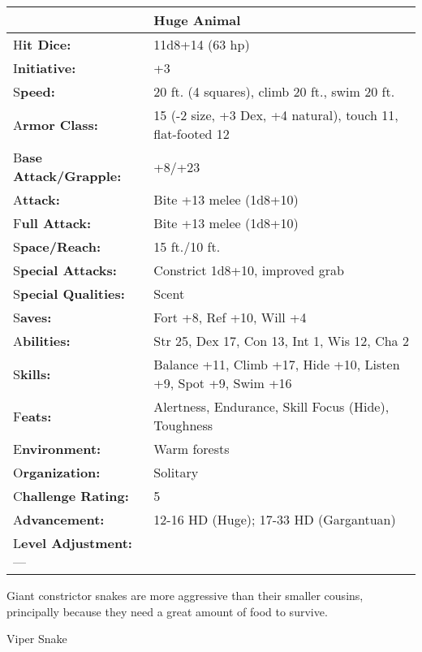 \documentclass{article}
\begin{document}
\begin{tabular}{|>{\raggedright}p{84pt}|>{\raggedright}p{242pt}|}
\hline
  & Huge Animal\tabularnewline
\hline
H\textbf{it Dice:} & 11d8+14 (63 hp)\tabularnewline
\hline
I\textbf{nitiative:} & +3\tabularnewline
\hline
S\textbf{peed:} & 20 ft. (4 squares), climb 20 ft., swim 20 ft.\tabularnewline
\hline
A\textbf{rmor Class:} & 15 (-2 size, +3 Dex, +4 natural), touch 11, flat-footed 
12\tabularnewline
\hline
B\textbf{ase Attack/Grapple:} & +8/+23\tabularnewline
\hline
A\textbf{ttack:} & Bite +13 melee (1d8+10)\tabularnewline
\hline
F\textbf{ull Attack:} & Bite +13 melee (1d8+10)\tabularnewline
\hline
S\textbf{pace/Reach:} & 15 ft./10 ft.\tabularnewline
\hline
S\textbf{pecial Attacks:} & Constrict 1d8+10, improved grab\tabularnewline
\hline
S\textbf{pecial Qualities:} & Scent\tabularnewline
\hline
S\textbf{aves:} & Fort +8, Ref +10, Will +4\tabularnewline
\hline
A\textbf{bilities:} & Str 25, Dex 17, Con 13, Int 1, Wis 12, Cha 2\tabularnewline
\hline
S\textbf{kills:} & Balance +11, Climb +17, Hide +10, Listen +9, Spot +9, Swim +16\tabularnewline
\hline
F\textbf{eats:} & Alertness, Endurance, Skill Focus (Hide), Toughness\tabularnewline
\hline
E\textbf{nvironment:} & Warm forests\tabularnewline
\hline
O\textbf{rganization:} & Solitary\tabularnewline
\hline
C\textbf{hallenge Rating:} & 5\tabularnewline
\hline
A\textbf{dvancement:} & 12-16 HD (Huge); 17-33 HD (Gargantuan)\tabularnewline
\hline
L\textbf{evel Adjustment:}--- & \tabularnewline
\hline
\end{tabular}

Giant constrictor snakes are more aggressive than their smaller cousins, principally 
because they need a great amount of food to survive.

\vspace{12pt}
Viper Snake
\end{document}
